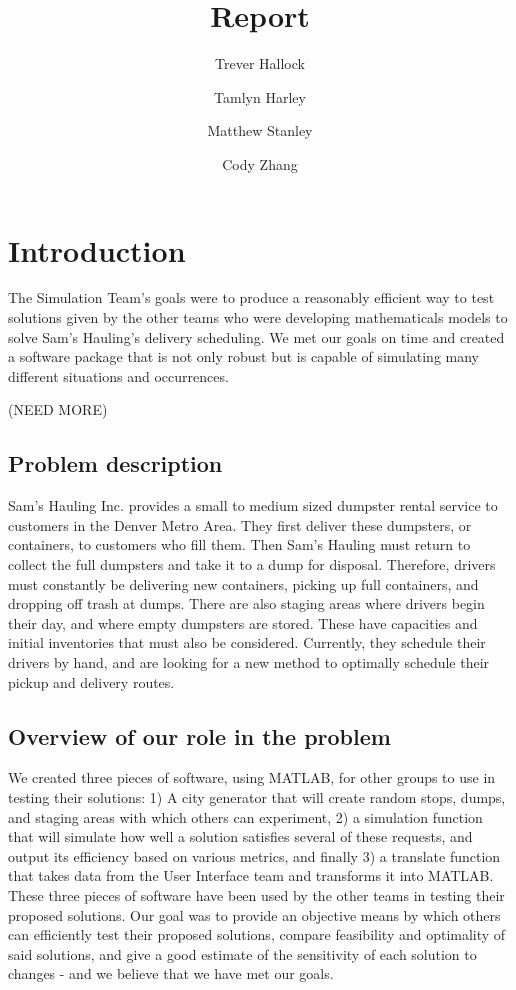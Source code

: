 \documentclass{article}
\title{Report}
\author{
	Trever Hallock \and
	Tamlyn Harley \and
	Matthew Stanley \and
	Cody Zhang
}
\begin{document}
\maketitle


\section{Introduction}

The Simulation Team's goals were to produce a reasonably efficient way to test solutions given by the other teams who were developing mathematicals models to solve Sam's Hauling's delivery scheduling.  We met our goals on time and created a software package that is not only robust but is capable of simulating many different situations and occurrences.

(NEED MORE)



\subsection{Problem description}

Sam’s Hauling Inc. provides a small to medium sized dumpster rental service to customers in the Denver Metro Area.  They first deliver these dumpsters, or containers, to customers who fill them. Then Sam’s Hauling must return to collect the full dumpsters and take it to a dump for disposal. Therefore, drivers must constantly be delivering new containers, picking up full containers, and dropping off trash at dumps.  There are also staging areas where drivers begin their day, and where empty dumpsters are stored. These have capacities and initial inventories that must also be considered.  Currently, they schedule their drivers by hand, and are looking for a new method to optimally schedule their pickup and delivery routes.

\subsection{Overview of our role in the problem}

We created three pieces of software, using MATLAB, for other groups to use in testing their solutions:  1) A city generator that will create random stops, dumps, and staging areas with which others can experiment, 2) a simulation function that will simulate how well a solution satisfies several of these requests, and output its efficiency based on various metrics, and finally 3) a translate function that takes data from the User Interface team and transforms it into MATLAB.  These three pieces of software have been used by the other teams in testing their proposed solutions.  Our goal was to provide an objective means by which others can efficiently test their proposed solutions, compare feasibility and optimality of said solutions, and give a good estimate of the sensitivity of each solution to changes - and we believe that we have met our goals.
\end{document}
